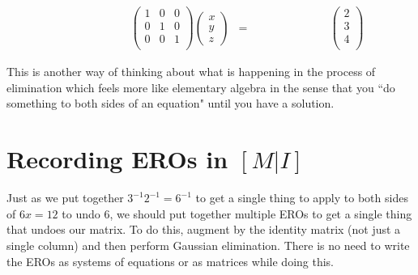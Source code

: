 \begin{example}
\begin{eqnarray*}
\phantom{
\begin{pmatrix}
1 & 0 & 0  \\ 
0 & 1 & -1 \\
0& 0 & 1  \\
\end{pmatrix} 
}
\begin{pmatrix}
1 & 0 & 0 \\
0 & 1 & 0  \\ 
0& 0 & 1  \\
\end{pmatrix} 
\begin{pmatrix}
 x \\ 
y \\
z 
\end{pmatrix} 
&=&
\phantom{
\begin{pmatrix}
1 & 0 & 0  \\ 
0 & 1 &  -1\\
0& 0  &  1  \\
\end{pmatrix} 
}
\! 
\begin{pmatrix}
2 \\
3 \\ 
4\\
\end{pmatrix} 
\end{eqnarray*}
\end{example}



\noindent
This is another way of thinking about what is happening in the process of elimination which feels more like elementary algebra in the sense that you ``do something to both sides of an equation" until you have a solution. 



\section{Recording EROs in $[M | I ] $}
Just as we put together $3^{-1}2^{-1}=6^{-1}$ to get a single thing to apply to both sides of $6x=12$ to undo $6$, we should put together multiple EROs  to get a single thing that undoes our matrix. 
To do this, augment by the identity matrix (not just a single column) and then perform Gaussian elimination. 
There is no need to write the EROs as systems of equations or as matrices while doing this. 

